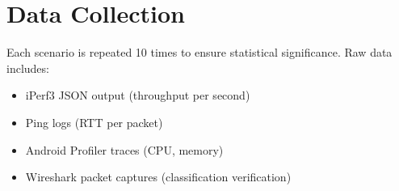 \section{Data Collection}

Each scenario is repeated 10 times to ensure statistical significance. Raw data includes:
\begin{itemize}
    \item iPerf3 JSON output (throughput per second)
    \item Ping logs (RTT per packet)
    \item Android Profiler traces (CPU, memory)
    \item Wireshark packet captures (classification verification)
\end{itemize}
